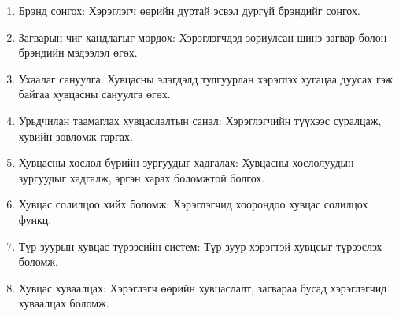 \begin{enumerate}
  \item Брэнд сонгох: Хэрэглэгч өөрийн дуртай эсвэл дургүй брэндийг сонгох.
  \item Загварын чиг хандлагыг мөрдөх: Хэрэглэгчдэд зориулсан шинэ загвар болон брэндийн мэдээлэл өгөх.
  \item Ухаалаг сануулга: Хувцасны элэгдэлд тулгуурлан хэрэглэх хугацаа дуусах гэж байгаа хувцасны сануулга өгөх.
  \item Урьдчилан таамаглах хувцаслалтын санал: Хэрэглэгчийн түүхээс суралцаж, хувийн зөвлөмж гаргах.
  \item Хувцасны хослол бүрийн зургуудыг хадгалах: Хувцасны хослолуудын зургуудыг хадгалж, эргэн харах боломжтой болгох.
  \item Хувцас солилцоо хийх боломж: Хэрэглэгчид хоорондоо хувцас солилцох функц.
  \item Түр зуурын хувцас түрээсийн систем: Түр зуур хэрэгтэй хувцсыг түрээслэх боломж.
  \item Хувцас хуваалцах: Хэрэглэгч өөрийн хувцаслалт, загвараа бусад хэрэглэгчид хуваалцах боломж.
\end{enumerate}
